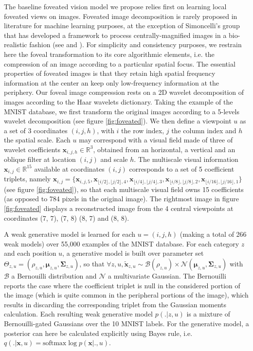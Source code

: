 \documentclass{article} %
\begin{document}
The baseline foveated vision model we propose relies first on learning local foveated views on images. Foveated image decomposition is rarely proposed in literature for machine learning purposes, at the exception of Simoncelli's group that has developed a framework to process centrally-magnified images in a bio-realistic fashion (see \cite{freeman2011metamers} and \cite{Deza2016piranhas}). For simplicity and consistency purposes, we restrain here the foveal transformation to its core algorithmic elements, i.e. the compression of an image according to a particular spatial focus. The essential properties of foveated images is that they retain high spatial frequency information at the center an keep only low-frequency information at the periphery. Our foveal image compression rests on a 2D wavelet decomposition of images according to the Haar wavelets dictionary. Taking the example of the MNIST database, we first transform the original images according to a 5-levels wavelet decomposition (see figure \ref{fig:foveated}). We then define a viewpoint $u$ as a set of 3 coordinates $(i,j,h)$, with $i$ the row index, $j$ the column index and $h$ the spatial scale. Each $u$ may correspond with a visual field made of three of wavelet coefficients $\boldsymbol{x}_{i,j,h} \in \mathbb{R}^3$, obtained from an horizontal, a vertical and an oblique filter at location $(i,j)$ and scale $h$.  The multiscale visual information $\boldsymbol{x}_{i,j} \in \mathbb{R}^{15}$ available at coordinates $(i,j)$ corresponds to a set of 5 coefficient triplets, namely $\boldsymbol{x}_{i,j}=\{\boldsymbol{x}_{i,j,5}, \boldsymbol{x}_{\lfloor i/2\rfloor,\lfloor j/2\rfloor,4}, \boldsymbol{x}_{\lfloor i/4\rfloor,\lfloor j/4\rfloor,3}, \boldsymbol{x}_{\lfloor i/8\rfloor,\lfloor j/8\rfloor, 2}, \boldsymbol{x}_{\lfloor i/16\rfloor,\lfloor j/16\rfloor, 1}\}$ (see figure \ref{fig:foveated}), so that each multiscale visual field owns 15 coefficients (as opposed to 784 pixels in the original image).
The rightmost image in figure \ref{fig:foveated} displays a reconstructed image from the 4 central viewpoints at coordinates (7, 7), (7, 8) (8, 7) and (8, 8).

A weak generative model is learned for each $u = (i,j,h)$ (making a total of 266 weak models) over 55,000 examples of the MNIST database. For each category $z$ and each position $u$, a generative model is built over parameter set $\Theta_{z,u} = (\rho_{z,u}, \boldsymbol{\mu}_{z,u}, \boldsymbol{\Sigma}_{z,u})$, so that $\forall z,u, \tilde{\boldsymbol{x}}_{z,u} \sim \mathcal{B}(\rho_{z,u}) \times \mathcal{N}(\boldsymbol{\mu}_{z,u}, \boldsymbol{\Sigma}_{z,u})$ with $\mathcal{B}$ a Bernouilli distribution and $\mathcal{N}$ a multivariate Gaussian. The Bernouilli reports the case where the coefficient triplet is null in the considered portion of the image (which is quite common in the peripheral portions of the image), which results in discarding the corresponding triplet from the Gaussian moments calculation. Each resulting weak generative model $p(.|z,u)$ is a mixture of Bernouilli-gated Gaussians over the 10 MNIST labels. For the generative model, a posterior can here be calculated explicitly using Bayes rule, i.e. $q(.|\boldsymbol{x},u) = \text{softmax} \log p(\boldsymbol{x}|.,u)$.
\end{document}
